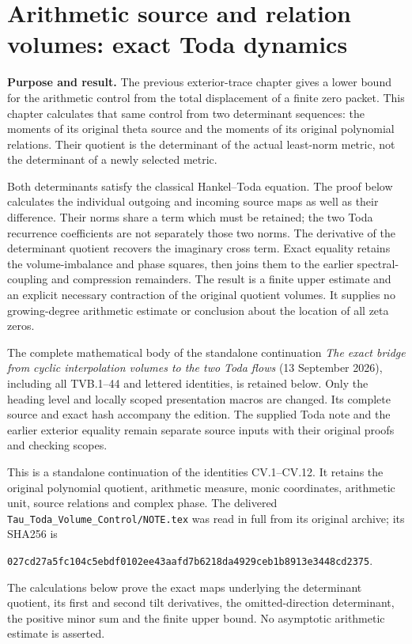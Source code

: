 \section{Arithmetic source and relation volumes: exact Toda dynamics}
\label{sec:arithmetic-toda-volumes}

\textbf{Purpose and result.}
The previous exterior-trace chapter gives a lower bound for the arithmetic
control from the total displacement of a finite zero packet. This chapter
calculates that same control from two determinant sequences: the moments
of its original theta source and the moments of its original polynomial
relations. Their quotient is the determinant of the actual least-norm
metric, not the determinant of a newly selected metric.

Both determinants satisfy the classical Hankel--Toda equation. The proof
below calculates the individual outgoing and incoming source maps as well
as their difference. Their norms share a term which must be retained;
the two Toda recurrence coefficients are not separately those two norms.
The derivative of the determinant quotient recovers the imaginary cross
term. Exact equality retains the volume-imbalance and phase squares, then
joins them to the earlier spectral-coupling and compression remainders.
The result is a finite upper estimate and an explicit necessary contraction
of the original quotient volumes. It supplies no growing-degree arithmetic
estimate or conclusion about the location of all zeta zeros.

The complete mathematical body of the standalone continuation
\emph{The exact bridge from cyclic interpolation volumes to the two Toda
flows} (13 September 2026), including all TVB.1--44 and lettered identities,
is retained below. Only the heading level and locally scoped presentation
macros are changed. Its complete source and exact hash accompany the
edition. The supplied Toda note and the earlier exterior equality remain
separate source inputs with their original proofs and checking scopes.

\begingroup
\setlength{\emergencystretch}{3em}
\def\C{\mathbb C}
\def\R{\mathbb R}
\def\tr{\operatorname{Tr}}
\def\Span{\operatorname{span}}
\def\im{\operatorname{im}}
\def\Alt{\operatorname{Alt}}


This is a standalone continuation of the identities CV.1--CV.12. It
retains the original polynomial quotient, arithmetic measure, monic
coordinates, arithmetic unit, source relations and complex phase. The
delivered \texttt{Tau\_Toda\_Volume\_Control/NOTE.tex} was read in full
from its original archive; its SHA256 is
\begin{center}\footnotesize
\texttt{027cd27a5fc104c5ebdf0102ee43aafd7b6218da4929ceb1b8913e3448cd2375}.
\end{center}
The calculations below prove the exact maps underlying the determinant
quotient, its first and second tilt derivatives, the omitted-direction
determinant, the positive minor sum and the finite upper bound. No
asymptotic arithmetic estimate is asserted.

